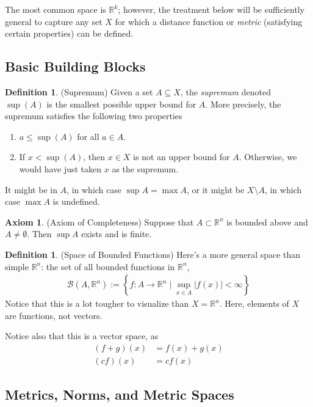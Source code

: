 \documentclass[12pt]{article}
\theoremstyle{plain}
\theoremstyle{definition}
\newtheorem{ax}[thm]{Axiom}
\newtheorem{defn}[thm]{Definition}
\theoremstyle{remark}
\newcommand{\R}{\mathbb{R}}
\begin{document}
The most common space is $\R^k$; however, the treatment below
will be sufficiently general to capture any set $X$ for which a distance
function or \emph{metric} (satisfying certain properties) can be
defined.

\subsection{Basic Building Blocks}


\begin{defn}{(Supremum)}
\label{defn:supdef1}
Given a set $A\subseteq X$, the \emph{supremum} denoted $\sup(A)$ is the
smallest possible upper bound for $A$.
More precisely, the supremum satisfies the following two properties
\begin{enumerate}
  \item $a\leq \sup(A)$ for all $a\in A$.
  \item If $x<\sup(A)$, then $x\in X$ is not an upper bound for $A$.
    Otherwise, we would have just taken $x$ as the supremum.
\end{enumerate}
It might be in $A$, in which case $\sup A = \max A$, or it might be
$X\setminus A$, in which case $\max A$ is undefined.
\end{defn}

\begin{ax}{(Axiom of Completeness)}
\label{ax:completeness}
Suppose that $A\subset \R^n$ is bounded above and $A\neq
\emptyset$. Then $\sup A$ exists and is finite.
\end{ax}

\begin{defn}{(Space of Bounded Functions)}
Here's a more general space than simple $\R^n$: the set of all
bounded functions in $\R^n$,
\begin{align*}
  \mathscr{B}(A,\R^n)
  :=
  \left\{
    f:A\rightarrow \R^n \; \big| \; \sup_{x\in A} |f(x)|<\infty
  \right\}
\end{align*}
Notice that this is a lot tougher to visualize than $X=\R^n$.
Here, elements of $X$ are functions, not vectors.

Notice also that this is a vector space, as
\begin{align*}
  (f+g)(x) &= f(x) + g(x)\\
  (cf)(x) &= cf(x)
\end{align*}
\end{defn}


\subsection{Metrics, Norms, and Metric Spaces}
\end{document}
